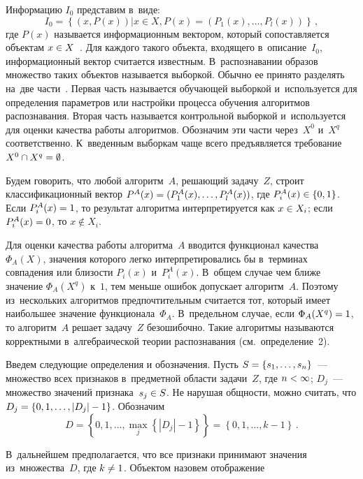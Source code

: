 \begin{multicols}{2}
Информацию $I_{0}$ представим в~виде:
$$
I_{0}=\left\lbrace (x,P(x))|x \in X, P(x)=(P_{1}(x),\ldots,P_{l}(x)) 
\right\rbrace \,, 
$$
где $ P(x) $ называется информационным вектором, который 
сопоставляется объектам $x \hm\in X$~\cite{zhur1}.
Для каждого такого объекта, входящего в~описание~$I_{0}$, 
информационный вектор считается известным.
В~распознавании образов множество таких объектов называется выборкой.
Обычно ее принято разделять на~две части~\cite{zhur1}.
Первая часть называется обучающей выборкой 
и~используется для определения параметров или настройки процесса 
обучения алгоритмов распознавания.
Вторая часть называется контрольной выборкой 
и~используется для оценки качества работы алгоритмов.
Обозначим эти части через~$X^{0}$ и~$X^{q}$ соответственно.
К~введенным выборкам чаще всего предъявляется требование 
$X^{0} \cap X^{q}\hm= \emptyset$.

Будем говорить, что любой алгоритм~$A$, реша\-ющий задачу~$Z$, 
строит классификационный вектор $ P^{A}(x)\hm=(P^{A}_{1}(x),\ldots,P^{A}_{l}(x)) $,
 где $ P^{A}_{i}(x)\hm\in \left\lbrace 0,1\right\rbrace $.
Если $ P^{A}_{i}(x)\hm=1 $, то результат алгоритма интерпретируется как 
$x \hm\in X_{i} $; если $ P^{A}_{i}(x)\hm=0 $, то $x \notin X_{i} $.

Для оценки качества работы алгоритма~$A$ вводится функционал качества $\Phi_{A}(X)$, 
значения которого легко интерпретировались бы в~терминах совпадения или близости 
$P_{i}(x)$ и~$P^{A}_{i}(x)$.
В~общем случае чем ближе значение $\Phi_{A}(X^{q})$ к~$1$, тем 
меньше ошибок допускает алгоритм~$A$.
Поэтому из~нескольких алгоритмов предпочтительным считается тот, который имеет 
наибольшее значение функционала~$\Phi_{A}$.
В~предельном случае, если $\Phi_{A}(X^{q})\hm=1$, то алгоритм~$A$ решает задачу~$Z$ 
безошибочно.
Такие алгоритмы называются корректными в~алгебраической теории распознавания 
(см.\ определение~2).

Введем следующие определения и обозначения.
Пусть $S\hm=\left\lbrace s_{1},\ldots,s_{n} \right\rbrace $~--- 
множество всех признаков в~предметной области задачи~$Z$, где $n\hm<\infty $;
 $D_{j}$~--- множество значений признака~$s_{j}\hm\in S$.
Не нарушая общности, можно считать, что $D_{j}\hm=\left\lbrace 0,1,\ldots,|D_{j}|-1 
\right\rbrace $.
Обозначим
$$
 D=\left\lbrace 0,1,\ldots,\max\limits_{j} \left\lbrace |D_{j}|-1\right\rbrace 
 \right\rbrace =\left\lbrace 0,1,\ldots,k-1 \right\rbrace \,. 
 $$

В~дальнейшем предполагается, что все признаки принимают значения 
из~множества~$D$, где $k\hm\neq 1 $.
Объектом назовем отображение


\end{multicols}
